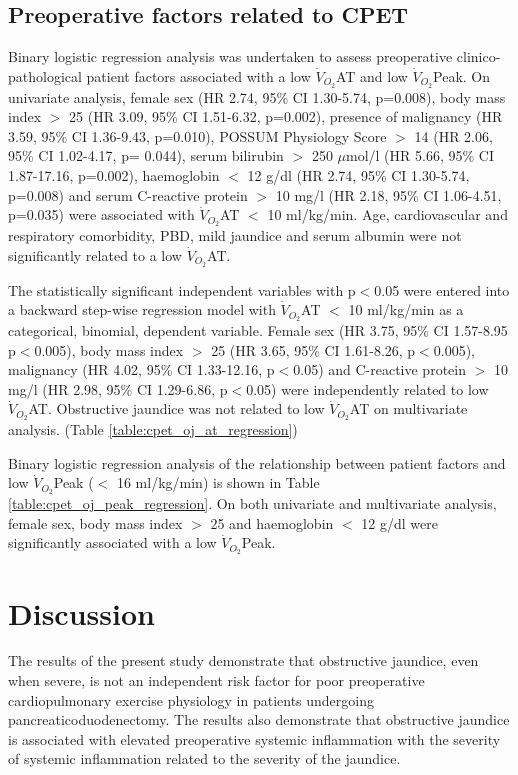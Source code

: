 \subsection{Preoperative factors related to CPET}
Binary logistic regression analysis was undertaken to assess preoperative clinico-pathological patient factors associated with a low $\dot{V}_{O_2}$AT and low $\dot{V}_{O_2}$Peak. 
On univariate analysis, female sex (HR 2.74, 95\% CI 1.30-5.74, p=0.008), body mass index $>$ 25 (HR 3.09, 95\% CI 1.51-6.32, p=0.002), presence of malignancy (HR 3.59, 95\% CI 1.36-9.43, p=0.010), POSSUM Physiology Score $>$ 14 (HR 2.06, 95\% CI 1.02-4.17, p= 0.044), serum bilirubin $>$ 250 $\mu$mol/l (HR 5.66, 95\% CI 1.87-17.16, p=0.002), haemoglobin $<$ 12 g/dl (HR 2.74, 95\% CI 1.30-5.74, p=0.008) and serum C-reactive protein $>$ 10 mg/l (HR 2.18, 95\% CI 1.06-4.51, p=0.035) were associated with $\dot{V}_{O_2}$AT $<$ 10 ml/kg/min. 
Age, cardiovascular and respiratory comorbidity, PBD, mild jaundice and serum albumin were not significantly related to a low $\dot{V}_{O_2}$AT. 

The statistically significant independent variables with p$<$0.05 were entered into a backward step-wise regression model with $\dot{V}_{O_2}$AT $<$ 10 ml/kg/min as a categorical, binomial, dependent variable. 
Female sex (HR 3.75, 95\% CI 1.57-8.95 p$<$0.005), body mass index $>$ 25 (HR 3.65, 95\% CI 1.61-8.26, p$<$0.005), malignancy (HR 4.02, 95\% CI 1.33-12.16, p$<$0.05) and C-reactive protein $>$ 10 mg/l (HR 2.98, 95\% CI 1.29-6.86, p$<$0.05) were independently related to low $\dot{V}_{O_2}$AT. 
Obstructive jaundice was not related to low $\dot{V}_{O_2}$AT on multivariate analysis. (Table \ref{table:cpet_oj_at_regression})

Binary logistic regression analysis of the relationship between patient factors and low $\dot{V}_{O_2}$Peak ($<$ 16 ml/kg/min) is shown in Table \ref{table:cpet_oj_peak_regression}. 
On both univariate and multivariate analysis, female sex, body mass index $>$ 25 and haemoglobin $<$ 12 g/dl were significantly associated with a low $\dot{V}_{O_2}$Peak. 




\clearpage

\section{Discussion}

The results of the present study demonstrate that obstructive jaundice, even when severe, is not an independent risk factor for poor preoperative cardiopulmonary exercise physiology in patients undergoing pancreaticoduodenectomy. 
The results also demonstrate that obstructive jaundice is associated with elevated preoperative systemic inflammation with the severity of systemic inflammation related to the severity of the jaundice.

